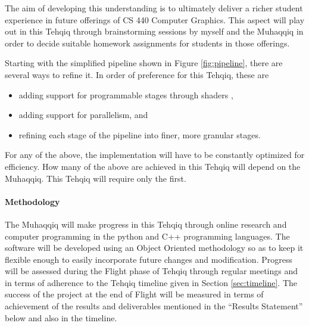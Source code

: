 \documentclass{article}
\begin{document}
The aim of developing this understanding is to ultimately deliver a richer student experience in future offerings of CS 440 Computer Graphics. This aspect will play out in this Tehqiq through brainstorming sessions by myself and the Muhaqqiq in order to decide suitable homework assignments for students in those offerings.

Starting with the simplified pipeline shown in Figure \ref{fig:pipeline}, there are several ways to refine it. In order of preference for this Tehqiq, these are
\begin{itemize}
  \item adding support for programmable stages through shaders \cite{shaders},
  \item adding support for parallelism, and
  \item refining each stage of the pipeline into finer, more granular stages.
\end{itemize}
For any of the above, the implementation will have to be constantly optimized for efficiency. How many of the above are achieved in this Tehqiq will depend on the Muhaqqiq. This Tehqiq will require only the first.

\paragraph{Methodology} The Muhaqqiq will make progress in this Tehqiq through online research and computer programming in the python and C++ programming languages. The software will be developed using an Object Oriented methodology so as to keep it flexible enough to easily incorporate future changes and modification. Progress will be assessed during the Flight phase of Tehqiq through regular meetings and in terms of adherence to the Tehqiq timeline given in Section \ref{sec:timeline}. The success of the project at the end of Flight will be measured in terms of achievement of the results and deliverables mentioned in the ``Results Statement'' below and also in the timeline.
\end{document}
